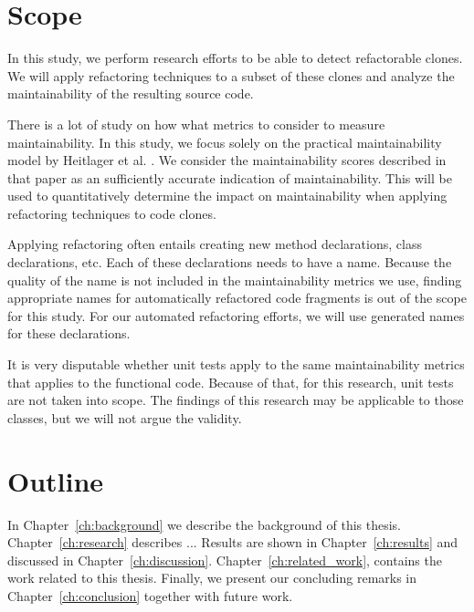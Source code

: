 \section{Scope}
In this study, we perform research efforts to be able to detect refactorable clones. We will apply refactoring techniques to a subset of these clones and analyze the maintainability of the resulting source code.

There is a lot of study on how what metrics to consider to measure maintainability. In this study, we focus solely on the practical maintainability model by Heitlager et al. \cite{heitlager2007practical}. We consider the maintainability scores described in that paper as an sufficiently accurate indication of maintainability. This will be used to quantitatively determine the impact on maintainability when applying refactoring techniques to code clones.

Applying refactoring often entails creating new method declarations, class declarations, etc. Each of these declarations needs to have a name. Because the quality of the name is not included in the maintainability metrics we use, finding appropriate names for automatically refactored code fragments is out of the scope for this study. For our automated refactoring efforts, we will use generated names for these declarations.

It is very disputable whether unit tests apply to the same maintainability metrics that applies to the functional code. Because of that, for this research, unit tests are not taken into scope. The findings of this research may be applicable to those classes, but we will not argue the validity.

\section{Outline}
In Chapter~\ref{ch:background} we describe the background of this thesis.
Chapter~\ref{ch:research} describes ...
Results are shown in Chapter~\ref{ch:results} and discussed in Chapter~\ref{ch:discussion}. Chapter~\ref{ch:related_work}, contains the work related to this thesis.
Finally, we present our concluding remarks in Chapter~\ref{ch:conclusion} together with future work.
